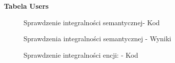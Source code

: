 \textbf{Tabela Users}
\begin{figure}[H]
    \centering
    \caption{Sprawdzenie integralności semantycznej- Kod}
\end{figure}
\begin{figure}[H]
    \centering
    \caption{Sprawdzenia integralności semantycznej - Wyniki}
\end{figure}
\begin{figure}[H]
    \centering
    \caption{Sprawdzenie integralności encji: - Kod}
\end{figure}
